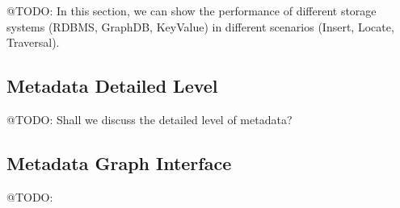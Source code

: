 @TODO: In this section, we can show the performance of different storage systems (RDBMS, GraphDB, KeyValue) in different scenarios (Insert, Locate, Traversal). 


\subsection{Metadata Detailed Level}

@TODO: Shall we discuss the detailed level of metadata? 

\subsection{Metadata Graph Interface}

@TODO: 